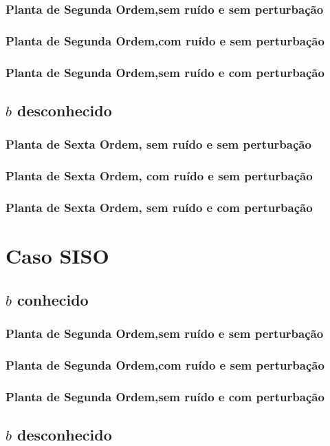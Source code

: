 \documentclass[
	12pt,				%
	openright,			%
	twoside,			%
	a4paper,			%
	english,			%
	french,				%
	spanish,			%
	brazil				%
	]{abntex2}
\begin{document}
\subsection{Planta de Segunda Ordem,sem ruído e sem perturbação}
\subsection{Planta de Segunda Ordem,com ruído e sem perturbação}
\subsection{Planta de Segunda Ordem,sem ruído e com perturbação}
\section{$b$ desconhecido}
\subsection{Planta de Sexta Ordem, sem ruído e sem perturbação}
\subsection{Planta de Sexta Ordem, com ruído e sem perturbação}
\subsection{Planta de Sexta Ordem, sem ruído e com perturbação}
\chapter{Caso SISO}
\section{$b$ conhecido}
\subsection{Planta de Segunda Ordem,sem ruído e sem perturbação}
\subsection{Planta de Segunda Ordem,com ruído e sem perturbação}
\subsection{Planta de Segunda Ordem,sem ruído e com perturbação}
\section{$b$ desconhecido}
\end{document}
